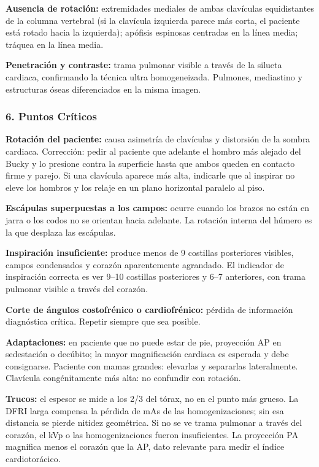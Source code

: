 \textbf{Ausencia de rotación:} extremidades mediales de ambas clavículas equidistantes de la columna vertebral (si la clavícula izquierda parece más corta, el paciente está rotado hacia la izquierda); apófisis espinosas centradas en la línea media; tráquea en la línea media.

\textbf{Penetración y contraste:} trama pulmonar visible a través de la silueta cardiaca, confirmando la técnica ultra homogeneizada. Pulmones, mediastino y estructuras óseas diferenciados en la misma imagen.

\subsubsection*{6. Puntos Críticos}

\textbf{Rotación del paciente:} causa asimetría de clavículas y distorsión de la sombra cardiaca. Corrección: pedir al paciente que adelante el hombro más alejado del Bucky y lo presione contra la superficie hasta que ambos queden en contacto firme y parejo. Si una clavícula aparece más alta, indicarle que al inspirar no eleve los hombros y los relaje en un plano horizontal paralelo al piso.

\textbf{Escápulas superpuestas a los campos:} ocurre cuando los brazos no están en jarra o los codos no se orientan hacia adelante. La rotación interna del húmero es la que desplaza las escápulas.

\textbf{Inspiración insuficiente:} produce menos de 9 costillas posteriores visibles, campos condensados y corazón aparentemente agrandado. El indicador de inspiración correcta es ver 9--10 costillas posteriores y 6--7 anteriores, con trama pulmonar visible a través del corazón.

\textbf{Corte de ángulos costofrénico o cardiofrénico:} pérdida de información diagnóstica crítica. Repetir siempre que sea posible.

\textbf{Adaptaciones:} en paciente que no puede estar de pie, proyección AP en sedestación o decúbito; la mayor magnificación cardiaca es esperada y debe consignarse. Paciente con mamas grandes: elevarlas y separarlas lateralmente. Clavícula congénitamente más alta: no confundir con rotación.

\textbf{Trucos:} el espesor se mide a los 2/3 del tórax, no en el punto más grueso. La DFRI larga compensa la pérdida de mAs de las homogenizaciones; sin esa distancia se pierde nitidez geométrica. Si no se ve trama pulmonar a través del corazón, el kVp o las homogenizaciones fueron insuficientes. La proyección PA magnifica menos el corazón que la AP, dato relevante para medir el índice cardiotorácico.


